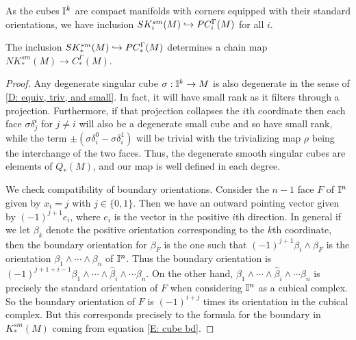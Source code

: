As the cubes $\mathbb{I}^k$ are compact manifolds with corners equipped with their standard orientations,
 we have inclusion $SK^{sm}_i(M) \hookrightarrow PC_i^\Gamma(M)$ for all $i$.


\begin{lemma}
The inclusion $SK^{sm}_*(M) \hookrightarrow PC_*^\Gamma(M)$ determines a chain map $NK^{sm}_*(M) \to C_*^\Gamma(M)$.
\end{lemma}
\begin{proof}
Any degenerate singular cube $\sigma:\mathbb{I}^k \to M$ is also degenerate in the sense of \cref{D: equiv, triv, and small}. In fact, it will have small rank as it filters through a projection. Furthermore, if that projection collapses the $i$th coordinate then each face $\sigma \delta_j^\epsilon$ for $j\neq i$ will also be a degenerate small cube and so have small rank, while the term $\pm (\sigma \delta_i^0-\sigma \delta_i^1)$ will be trivial with the trivializing map $\rho$ being the interchange of the two faces. Thus, the degenerate smooth singular cubes are elements of $Q_*(M)$, and our map is well defined in each degree.

We check compatibility of boundary orientations. Consider the $n-1$ face $F$ of $\mathbb{I}^n$ given by $x_i = j$ with $j\in\{0,1\}$. Then we have an outward pointing vector given by $(-1)^{j+1}e_i$, where $e_i$ is the vector in the positive $i$th direction. In general if we let $\beta_k$ denote the positive orientation corresponding to the $k$th coordinate, then the boundary orientation for $\beta_F$ is the one such that
$(-1)^{j+1}\beta_i\wedge\beta_F$ is the orientation $\beta_1 \wedge\cdots\wedge \beta_n$ of $\mathbb{I}^n$. Thus the boundary orientation is $(-1)^{j+1+i-1}\beta_1 \wedge \cdots \wedge \hat{\beta}_i \wedge \cdots\beta_n$. On the other hand, $\beta_1 \wedge \cdots \wedge \hat{\beta}_i \wedge \cdots\beta_n$ is precisely the standard orientation of $F$ when considering $\mathbb{I}^n$ as a cubical complex. So the boundary orientation of $F$ is $(-1)^{i+j}$ times its orientation in the cubical complex. But this corresponds precisely to the formula for the boundary in $K^{sm}_*(M)$ coming from equation \eqref{E: cube bd}.
\end{proof}

